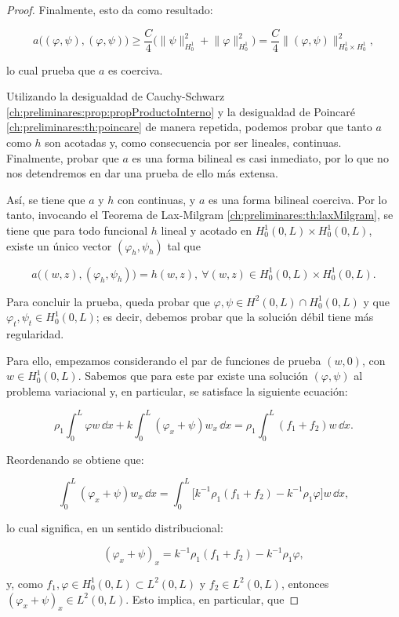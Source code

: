 \begin{proof}
    Finalmente, esto da como resultado:

    \[a\big((\varphi, \psi), (\varphi, \psi)\big) \geq \frac{C}{4}\big( \lVert \psi \rVert^2_{H^1_0} + \lVert \varphi \rVert^2_{H^1_0} \big) = \frac{C}{4}\lVert (\varphi, \psi) \rVert^2_{H_0^1 \times H_0^1},\]

    lo cual prueba que $a$ es coerciva.

    Utilizando la desigualdad de Cauchy-Schwarz \ref{ch:preliminares:prop:propProductoInterno} y la desigualdad de Poincaré \ref{ch:preliminares:th:poincare} de manera repetida, podemos probar que tanto $a$ como $h$ son acotadas y, como consecuencia por ser lineales, continuas. Finalmente, probar que $a$ es una forma bilineal es casi inmediato, por lo que no nos detendremos en dar una prueba de ello más extensa.

    Así, se tiene que $a$ y $h$ con continuas, y $a$ es una forma bilineal coerciva. Por lo tanto, invocando el Teorema de Lax-Milgram \ref{ch:preliminares:th:laxMilgram}, se tiene que para todo funcional $h$ lineal y acotado en $H_0^1(0,L) \times H_0^1(0,L)$, existe un único vector $(\varphi_h, \psi_h)$ tal que

    \[a\big((w, z), (\varphi_h, \psi_h)\big) = h(w,z), \ \forall (w,z) \in H_0^1(0,L) \times H_0^1(0,L).\]

    Para concluir la prueba, queda probar que $\varphi, \psi \in H^2(0,L) \cap H^1_0(0,L)$ y que $\varphi_t, \psi_t \in H^1_0(0,L)$; es decir, debemos probar que la solución débil tiene más regularidad. 
    
    Para ello, empezamos considerando el par de funciones de prueba $(w,0)$, con $w \in H_0^1(0,L)$. Sabemos que para este par existe una solución $(\varphi, \psi)$ al problema variacional y, en particular, se satisface la siguiente ecuación:

    \[\rho_1 \int_0^L \varphi w \, \dd x + k \int_0^L(\varphi_x + \psi) w_x \, \dd x = \displaystyle\rho_1 \int_0^L (f_1 + f_2) w \, \dd x.\]    

    Reordenando se obtiene que:

    \[\int_0^L(\varphi_x + \psi) w_x \, \dd x = \int_0^L \big[k^{-1}\rho_1(f_1 + f_2) - k^{-1}\rho_1\varphi \big]w \, \dd x,\]

    lo cual significa, en un sentido distribucional:

    \[(\varphi_x + \psi)_x = k^{-1}\rho_1(f_1 + f_2) - k^{-1}\rho_1\varphi,\]

    y, como $f_1, \varphi \in H_0^1(0,L) \subset L^2(0,L)$ y $f_2 \in L^2(0,L)$, entonces $(\varphi_x + \psi)_x \in L^2(0,L)$. Esto implica, en particular, que


\end{proof}
